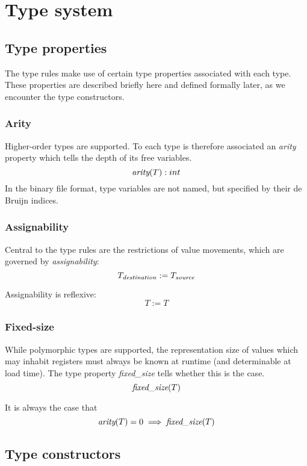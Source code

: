 \documentclass[a4paper]{report}
\newcommand\arity{{\ensuremath\textit{arity}}}
\newcommand\fixedsize{{\ensuremath\textit{fixed\_size}}}
\newcommand\implies{\;\Longrightarrow\;}
\begin{document}
\chapter{Type system}
\label{chap:typesystem}

\section{Type properties}

The type rules make use of certain type properties associated with each type.
These properties are described briefly here and defined formally later,
as we encounter the type constructors.

\subsection{Arity}
Higher-order types are supported. To each type is therefore associated
an \emph{arity} property which tells the depth of its free variables.
$$
\arity(T) : int
$$
In the binary file format, type variables are not named, but specified
by their de Bruijn indices.

\subsection{Assignability}
Central to the type rules are the restrictions of value movements,
which are governed by \emph{assignability}:
$$
T_{\it destination} := T_{\it source}
$$

Assignability is reflexive:
$$T := T$$

\subsection{Fixed-size}
While polymorphic types are supported, the representation size of values
which may inhabit registers must always be known at runtime (and
determinable at load time).
The type property \emph{fixed\_size} tells whether this is the case.
$$
\fixedsize(T)
$$

It is always the case that
$$
\arity(T) = 0 \implies \fixedsize(T)
$$

\section{Type constructors}
\end{document}
